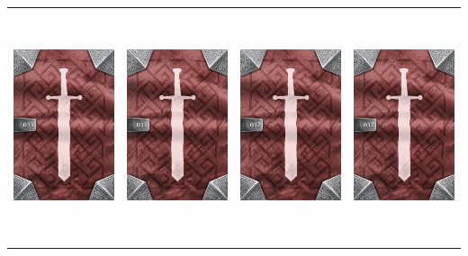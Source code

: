 \documentclass{minimal}
\begin{document}
{\begin{longtable}{llll}
\includegraphics[width=44mm,height=68mm]{./1-14/gh-013-minor-stamina-potion-back.png} &
\includegraphics[width=44mm,height=68mm]{./1-14/gh-013-minor-stamina-potion-back.png} &
\includegraphics[width=44mm,height=68mm]{./1-14/gh-012-minor-healing-potion-back.png} &
\includegraphics[width=44mm,height=68mm]{./1-14/gh-012-minor-healing-potion-back.png}\\ 

\end{longtable}}
\end{document}
